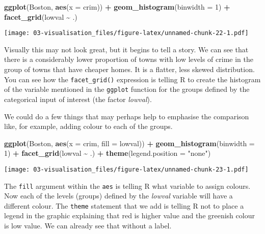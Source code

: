 \documentclass[
]{book}
\newenvironment{Shaded}{\begin{snugshade}}{\end{snugshade}}
\newcommand{\AttributeTok}[1]{\textcolor[rgb]{0.13,0.29,0.53}{#1}}
\newcommand{\DecValTok}[1]{\textcolor[rgb]{0.00,0.00,0.81}{#1}}
\newcommand{\FunctionTok}[1]{\textcolor[rgb]{0.13,0.29,0.53}{\textbf{#1}}}
\newcommand{\NormalTok}[1]{#1}
\newcommand{\SpecialCharTok}[1]{\textcolor[rgb]{0.81,0.36,0.00}{\textbf{#1}}}
\newcommand{\StringTok}[1]{\textcolor[rgb]{0.31,0.60,0.02}{#1}}
\begin{document}
\begin{Shaded}
\begin{Highlighting}[]
\FunctionTok{ggplot}\NormalTok{(Boston, }\FunctionTok{aes}\NormalTok{(}\AttributeTok{x =}\NormalTok{ crim)) }\SpecialCharTok{+}
  \FunctionTok{geom\_histogram}\NormalTok{(}\AttributeTok{binwidth =} \DecValTok{1}\NormalTok{) }\SpecialCharTok{+}
  \FunctionTok{facet\_grid}\NormalTok{(lowval }\SpecialCharTok{\textasciitilde{}}\NormalTok{ .) }
\end{Highlighting}
\end{Shaded}

\texttt{[image: 03-visualisation\_files/figure-latex/unnamed-chunk-22-1.pdf]}

Visually this may not look great, but it begins to tell a story. We can see that there is a considerably lower proportion of towns with low levels of crime in the group of towns that have cheaper homes. It is a flatter, less skewed distribution. You can see how the \texttt{facet\_grid()} expression is telling R to create the histogram of the variable mentioned in the \texttt{ggplot} function for the groups defined by the categorical input of interest (the factor \emph{lowval}).

We could do a few things that may perhaps help to emphasise the comparison like, for example, adding colour to each of the groups.

\begin{Shaded}
\begin{Highlighting}[]
\FunctionTok{ggplot}\NormalTok{(Boston, }\FunctionTok{aes}\NormalTok{(}\AttributeTok{x =}\NormalTok{ crim, }\AttributeTok{fill =}\NormalTok{ lowval)) }\SpecialCharTok{+}
  \FunctionTok{geom\_histogram}\NormalTok{(}\AttributeTok{binwidth =} \DecValTok{1}\NormalTok{) }\SpecialCharTok{+}
  \FunctionTok{facet\_grid}\NormalTok{(lowval }\SpecialCharTok{\textasciitilde{}}\NormalTok{ .) }\SpecialCharTok{+}
  \FunctionTok{theme}\NormalTok{(}\AttributeTok{legend.position =} \StringTok{"none"}\NormalTok{)}
\end{Highlighting}
\end{Shaded}

\texttt{[image: 03-visualisation\_files/figure-latex/unnamed-chunk-23-1.pdf]}

The \texttt{fill} argument within the \texttt{aes} is telling R what variable to assign colours. Now each of the levels (groups) defined by the \emph{lowval} variable will have a different colour. The \texttt{theme} statement that we add is telling R not to place a legend in the graphic explaining that red is higher value and the greenish colour is low value. We can already see that without a label.
\end{document}
